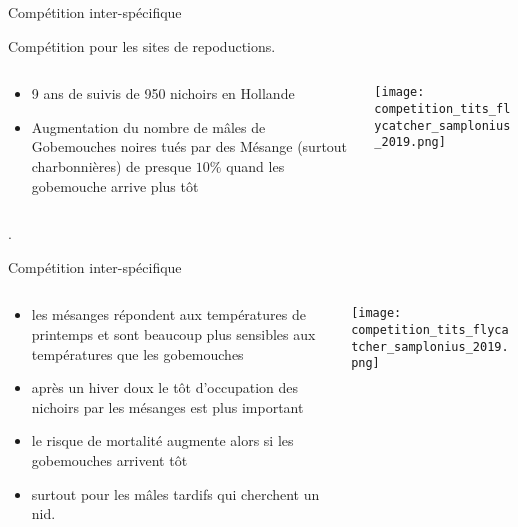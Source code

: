 \documentclass[10pt]{beamer}
\begin{document}
\begin{frame}{Compétition inter-spécifique}
 
    Compétition pour les sites de repoductions. 

  \begin{columns}[c]
 \begin{column}[c]{0.5\textwidth}
      \begin{itemize}[<+->]
	\item 9 ans de suivis de 950 nichoirs en Hollande
      \item Augmentation du nombre de mâles de Gobemouches noires tués par des Mésange (surtout charbonnières) de presque $10\%$ quand les gobemouche arrive plus tôt
      \end{itemize}
    \end{column}
    \begin{column}[c]{0.5\textwidth}
      \begin{center}
               \texttt{[image: competition\_tits\_flycatcher\_samplonius\_2019.png]}
      \end{center}
    \end{column}
    \end{columns}
.   \begin{tiny}
    \cite{Samplonius2019}
  \end{tiny}
\end{frame}




\begin{frame}{Compétition inter-spécifique}
  \begin{columns}[c]
 \begin{column}[c]{0.5\textwidth}
\begin{footnotesize}
      \begin{itemize}[<+->]
	      \item les mésanges répondent aux températures de printemps et sont beaucoup plus sensibles aux températures que les gobemouches
      \item après un hiver doux le tôt d'occupation des nichoirs par les mésanges est plus important
      \item le risque de mortalité augmente alors si les gobemouches arrivent tôt 
	\item surtout pour les mâles tardifs qui cherchent un nid. 
      \end{itemize}
\end{footnotesize}
    \end{column}
    \begin{column}[c]{0.5\textwidth}
      \begin{center}
               \texttt{[image: competition\_tits\_flycatcher\_samplonius\_2019.png]}
      \end{center}
    \end{column}
     \end{columns}
  \begin{tiny}
    \cite{Samplonius2019}
  \end{tiny}
\end{frame}
\end{document}
